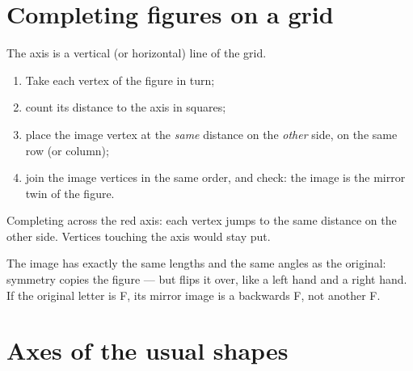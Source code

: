 \section{Completing figures on a grid}

\begin{method}\label{met:g4:symmetry:grid}
The axis is a vertical (or horizontal) line of the grid.
\begin{enumerate}
  \item Take each vertex of the figure in turn;
  \item count its distance to the axis in squares;
  \item place the image vertex at the \emph{same} distance on the
        \emph{other} side, on the same row (or column);
  \item join the image vertices in the same order, and check: the
        image is the mirror twin of the figure.
\end{enumerate}
\end{method}

\begin{omfigure}

{\small Completing across the red axis: each vertex jumps to the same
distance on the other side. Vertices touching the axis would stay
put.}
\end{omfigure}

\begin{example}\label{ex:g4:symmetry:properties}
The image has exactly the same lengths and the same angles as the
original: symmetry copies the figure --- but flips it over, like a
left hand and a right hand. If the original letter is F, its mirror
image is a backwards F, not another F.
\end{example}

\section{Axes of the usual shapes}

